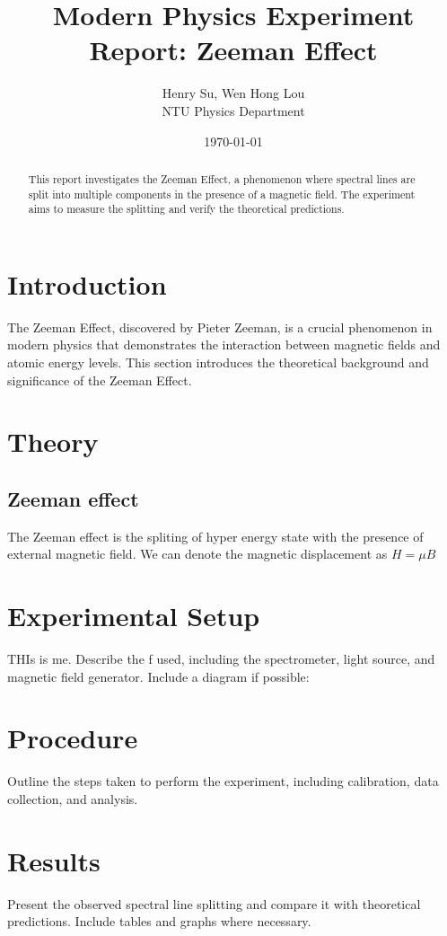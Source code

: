\documentclass[a4paper,12pt]{article}
\title{Modern Physics Experiment Report: Zeeman Effect}
\author{Henry Su, Wen Hong Lou\\ NTU Physics Department}
\date{\today}
\begin{document}
\maketitle

\begin{abstract}
This report investigates the Zeeman Effect, a phenomenon where spectral lines are split into multiple components in the presence of a magnetic field. The experiment aims to measure the splitting and verify the theoretical predictions. 
\end{abstract}

\tableofcontents
\newpage

\section{Introduction}
The Zeeman Effect, discovered by Pieter Zeeman, is a crucial phenomenon in modern physics that demonstrates the interaction between magnetic fields and atomic energy levels. This section introduces the theoretical background and significance of the Zeeman Effect.

\section{Theory}
\subsection{Zeeman effect}
The Zeeman effect is the spliting of hyper energy state with the presence of external magnetic field. We can denote the magnetic displacement as 
$H = \mu B$

\section{Experimental Setup}
THIs is me.
Describe the f used, including the spectrometer, light source, and magnetic field generator. Include a diagram if possible:

\section{Procedure}
Outline the steps taken to perform the experiment, including calibration, data collection, and analysis.

\section{Results}
Present the observed spectral line splitting and compare it with theoretical predictions. Include tables and graphs where necessary.
\end{document}
